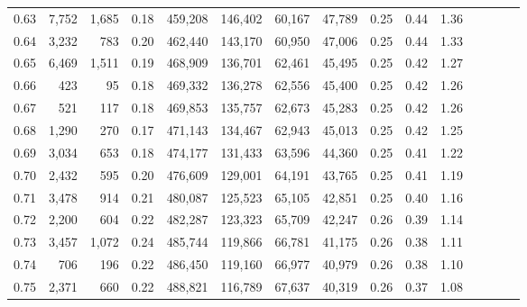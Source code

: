 \begin{tabular}{rrrcrrrrrrrrrrr}
0.63 &   7,752 &  1,685 &                                       0.18 &  459,208 &  146,402 &   60,167 &   47,789 &  0.25 &  0.44 &                         1.36 \\
0.64 &   3,232 &    783 &                                       0.20 &  462,440 &  143,170 &   60,950 &   47,006 &  0.25 &  0.44 &                         1.33 \\
0.65 &   6,469 &  1,511 &                                       0.19 &  468,909 &  136,701 &   62,461 &   45,495 &  0.25 &  0.42 &                         1.27 \\
0.66 &     423 &     95 &                                       0.18 &  469,332 &  136,278 &   62,556 &   45,400 &  0.25 &  0.42 &                         1.26 \\
0.67 &     521 &    117 &                                       0.18 &  469,853 &  135,757 &   62,673 &   45,283 &  0.25 &  0.42 &                         1.26 \\
0.68 &   1,290 &    270 &                                       0.17 &  471,143 &  134,467 &   62,943 &   45,013 &  0.25 &  0.42 &                         1.25 \\
0.69 &   3,034 &    653 &                                       0.18 &  474,177 &  131,433 &   63,596 &   44,360 &  0.25 &  0.41 &                         1.22 \\
0.70 &   2,432 &    595 &                                       0.20 &  476,609 &  129,001 &   64,191 &   43,765 &  0.25 &  0.41 &                         1.19 \\
0.71 &   3,478 &    914 &                                       0.21 &  480,087 &  125,523 &   65,105 &   42,851 &  0.25 &  0.40 &                         1.16 \\
0.72 &   2,200 &    604 &                                       0.22 &  482,287 &  123,323 &   65,709 &   42,247 &  0.26 &  0.39 &                         1.14 \\
0.73 &   3,457 &  1,072 &                                       0.24 &  485,744 &  119,866 &   66,781 &   41,175 &  0.26 &  0.38 &                         1.11 \\
0.74 &     706 &    196 &                                       0.22 &  486,450 &  119,160 &   66,977 &   40,979 &  0.26 &  0.38 &                         1.10 \\
0.75 &   2,371 &    660 &                                       0.22 &  488,821 &  116,789 &   67,637 &   40,319 &  0.26 &  0.37 &                         1.08 \\

\end{tabular}
